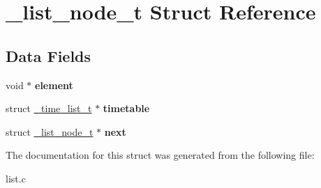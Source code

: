 \hypertarget{struct__list__node__t}{}\section{\+\_\+list\+\_\+node\+\_\+t Struct Reference}
\label{struct__list__node__t}
\subsection*{Data Fields}
\begin{DoxyCompactItemize}
\item 
\hypertarget{struct__list__node__t_abea5f5c0727c725b8f3b21f14b45abf1}{}void $\ast$ {\bfseries element}\label{struct__list__node__t_abea5f5c0727c725b8f3b21f14b45abf1}

\item 
\hypertarget{struct__list__node__t_a9d4fb0d7e4c7c4af6132c909c4a655ef}{}struct \hyperlink{struct__time__list__t}{\+\_\+time\+\_\+list\+\_\+t} $\ast$ {\bfseries timetable}\label{struct__list__node__t_a9d4fb0d7e4c7c4af6132c909c4a655ef}

\item 
\hypertarget{struct__list__node__t_a7e892551dbe86f632a09818435bdb459}{}struct \hyperlink{struct__list__node__t}{\+\_\+list\+\_\+node\+\_\+t} $\ast$ {\bfseries next}\label{struct__list__node__t_a7e892551dbe86f632a09818435bdb459}

\end{DoxyCompactItemize}


The documentation for this struct was generated from the following file\+:\begin{DoxyCompactItemize}
\item 
list.\+c\end{DoxyCompactItemize}
